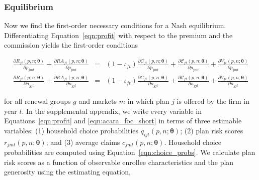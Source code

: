 \documentclass[12pt]{article}
\begin{document}
\subsubsection*{Equilibrium}

Now we find the first-order necessary conditions for a Nash equilibrium.  Differentiating Equation~\eqref{eqn:profit} with respect to the premium and the commission yields the  first-order conditions  

\vspace{-0.4in}	
\begin{footnotesize}
\begin{eqnarray}
\label{eqn:acara_foc_short}
	\frac{\partial R_{ft}(\textit{p},\textit{n};\boldsymbol{\theta})}{\partial p_{jmt}} + \frac{\partial RA_{ft}(\textit{p},\textit{n};\boldsymbol{\theta})}{\partial p_{jmt}} &=& (1-\iota_{ft}) \frac{\partial C_{ft}(\textit{p},\textit{n};\boldsymbol{\theta})}{\partial p_{jmt}} + \frac{\partial \mathcal{C}_{ft}(\textit{p},\textit{n};\boldsymbol{\theta})}{\partial p_{jmt}} + \frac{\partial V_{ft}(\textit{p},\textit{n};\boldsymbol{\theta})}{\partial p_{jmt}} \nonumber \\
	\frac{\partial R_{ft}(\textit{p},\textit{n};\boldsymbol{\theta})}{\partial n_{gjt}} + \frac{\partial RA_{ft}(\textit{p},\textit{n};\boldsymbol{\theta})}{\partial n_{gjt}} &=& (1-\iota_{ft}) \frac{\partial C_{ft}(\textit{p},\textit{n};\boldsymbol{\theta})}{\partial n_{gjt}} + \frac{\partial \mathcal{C}_{ft}(\textit{p},\textit{n};\boldsymbol{\theta})}{\partial n_{gjt}} + \frac{\partial V_{ft}(\textit{p},\textit{n};\boldsymbol{\theta})}{\partial n_{gjt}}
\end{eqnarray}
\end{footnotesize}

\noindent for all renewal groups $g$ and markets $m$ in which plan $j$ is offered by the firm in year $t$. In the supplemental appendix, we write every variable in Equations~\eqref{eqn:profit} and \eqref{eqn:acara_foc_short} in terms of three estimable variables: (1) household choice probabilities $q_{ijt}(\textit{p},\textit{n};\boldsymbol{\theta})$; (2) plan risk scores $r_{jmt}(\textit{p},\textit{n};\boldsymbol{\theta})$; and (3) average claims $c_{jmt}(\textit{p},\textit{n};\boldsymbol{\theta})$.  Household choice probabilities are computed using Equation~\eqref{eqn:choice_probs}.  We calculate plan risk scores as a function of observable enrollee characteristics and the plan generosity using the estimating equation,
\end{document}
